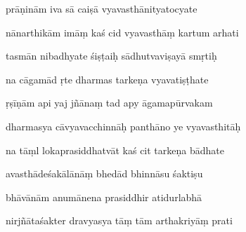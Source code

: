 \documentclass[article,12pt,a4paper]{memoir}%
\newcounter{parCount}
\begin{document}
	  
	  \pstart \leavevmode%
	prāṇinām iva sā caiṣā vyavasthānityatocyate 
	{}
	\pend%
      

	  
	  \pstart {} nānarthikām imāṃ kaś cid vyavasthāṃ kartum arhati 
	{}
	\pend%
      

	  
	  \pstart \leavevmode%
	tasmān nibadhyate śiṣṭaiḥ sādhutvaviṣayā smṛtiḥ 
	{}
	\pend%
      

	  
	  \pstart {} na cāgamād ṛte dharmas tarkeṇa vyavatiṣṭhate 
	{}
	\pend%
      

	  
	  \pstart \leavevmode%
	ṛṣīṇām api yaj jñānaṃ tad apy āgamapūrvakam 
	{}
	\pend%
      

	  
	  \pstart {} dharmasya cāvyavacchinnāḥ panthāno ye vyavasthitāḥ 
	{}
	\pend%
      

	  
	  \pstart \leavevmode%
	na tāṃl lokaprasiddhatvāt kaś cit tarkeṇa bādhate 
	{}
	\pend%
      

	  
	  \pstart {} avasthādeśakālānāṃ bhedād bhinnāsu śaktiṣu 
	{}
	\pend%
      

	  
	  \pstart \leavevmode%
	bhāvānām anumānena prasiddhir atidurlabhā 
	{}
	\pend%
      

	  
	  \pstart {} nirjñātaśakter dravyasya tāṃ tām arthakriyāṃ prati 
	{}
	\pend%
      
\end{document}
